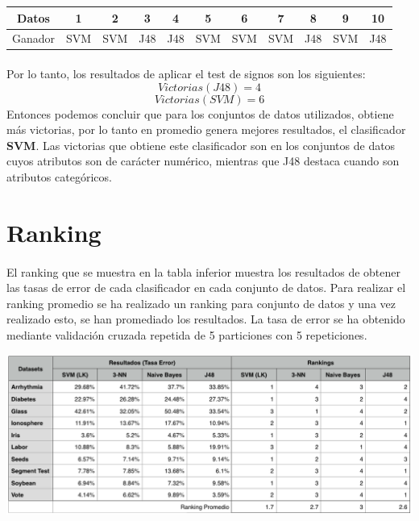 \documentclass[10pt, a4paper,spanish]{article}
\begin{document}
		\hfill
		\begin{center}
			\begin{tabular}{ | c || c | c | c | c | c | c | c | c | c | c | }
				\hline
				Datos		& 1 	& 2		& 3 	& 4 	& 5 	& 6		& 7 	& 8 	& 9 	& 10 \\ \hline \hline
				Ganador		& SVM 	& SVM 	& J48 	& J48 	& SVM 	& SVM 	& SVM 	& J48 	& SVM 	& J48 \\
				\hline
			\end{tabular}
		\end{center}

		\paragraph{}
		Por lo tanto, los resultados de aplicar el test de signos son los siguientes:
		\[Victorias(J48) = 4\]
		\[Victorias(SVM) = 6\]
		Entonces podemos concluir que para los conjuntos de datos utilizados, obtiene más victorias, por lo tanto en promedio genera mejores resultados, el clasificador \textbf{SVM}. Las victorias que obtiene este clasificador son en los conjuntos de datos cuyos atributos son de carácter numérico, mientras que J48 destaca cuando son atributos categóricos.

	\section{Ranking}

		\paragraph{}
		El ranking que se muestra en la tabla inferior muestra los resultados de obtener las tasas de error de cada clasificador en cada conjunto de datos. Para realizar el ranking promedio se ha realizado un ranking para conjunto de datos y una vez realizado esto, se han promediado los resultados. La tasa de error se ha obtenido mediante validación cruzada repetida de 5 particiones con 5 repeticiones.

		\begin{center}
			\includegraphics[width=\textwidth]{ranking-table}
		\end{center}
\end{document}

